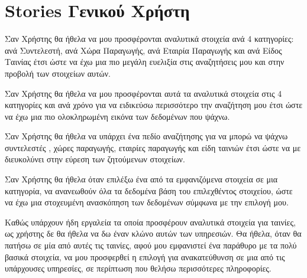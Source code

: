 \section{Stories Γενικού Χρήστη}
\begin{tcolorbox}[colback=fg!10!white,colframe=gbg!100!white,
	title=1η ιστορία]
Σαν Χρήστης θα ήθελα να μου προσφέρονται αναλυτικά στοιχεία ανά 4 κατηγορίες: ανά Συντελεστή, ανά Χώρα Παραγωγής, ανά Εταιρία Παραγωγής και ανά Είδος Ταινίας έτσι ώστε να έχω μια πιο μεγάλη ευελιξία στις αναζητήσεις μου και στην προβολή των στοιχείων αυτών.
\end{tcolorbox}

\begin{tcolorbox}[colback=fg!10!white,colframe=gbg!100!white,
	title=2η ιστορία]
Σαν Χρήστης θα ήθελα να μου προσφέρονται αυτά τα αναλυτικά στοιχεία στις 4 κατηγορίες και ανά χρόνο για να ειδικεύσω περισσότερο την αναζήτηση μου έτσι ώστε να έχω μια πιο ολοκληρωμένη εικόνα των δεδομένων που ψάχνω.
\end{tcolorbox}

\begin{tcolorbox}[colback=fg!10!white,colframe=gbg!100!white,
	title=3η ιστορία]
Σαν Χρήστης θα ήθελα να υπάρχει ένα πεδίο αναζήτησης για να μπορώ να ψάχνω συντελεστές , χώρες παραγωγής, εταιρίες παραγωγής και είδη ταινιών έτσι ώστε να με διευκολύνει στην εύρεση των ζητούμενων στοιχείων.
\end{tcolorbox}

\begin{tcolorbox}[colback=fg!10!white,colframe=gbg!100!white,
	title=4η ιστορία]
Σαν Χρήστης θα ήθελα όταν επιλέξω ένα από τα εμφανιζόμενα στοιχεία σε μια κατηγορία, να ανανεωθούν όλα τα δεδομένα βάση του επιλεχθέντος στοιχείου, ώστε να έχω μια στοχευμένη ανασκόπηση των δεδομένων σύμφωνα με την επιλογή μου.
\end{tcolorbox}

\begin{tcolorbox}[colback=fg!10!white,colframe=gbg!100!white,
 	title=5η ιστορία]
Καθώς υπάρχουν ήδη εργαλεία τα οποία προσφέρουν αναλυτικά στοιχεία για ταινίες, ως χρήστης δε θα ήθελα να δω έναν κλώνο αυτών των υπηρεσιών. Θα ήθελα, όταν θα πατήσω σε μία από αυτές τις ταινίες, αφού μου εμφανιστεί ένα παράθυρο με τα πολύ βασικά στοιχεία, να μου προσφερθεί η επιλογή για ανακατεύθυνση σε μια από τις υπάρχουσες υπηρεσίες, σε περίπτωση που θελήσω περισσότερες πληροφορίες.
\end{tcolorbox}


